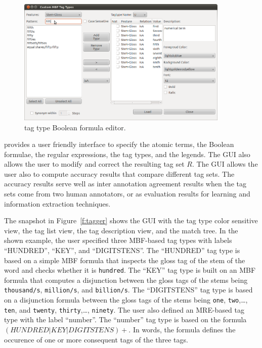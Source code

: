 \begin{figure}[tb]
  \centering
  \includegraphics[width=0.9\textwidth]{figures/mbfedit}
  \caption{\framework tag type Boolean formula editor.}
  \label{f:bfe}
\end{figure}

\framework provides a user friendly interface to specify the 
atomic terms, the \framework Boolean formulae, the \framework regular expressions, 
the tag types, and the legends. 
The \framework GUI also allows the user to modify and correct the 
resulting tag set $R$.
The \framework GUI allows the user also to compute accuracy results 
that compare different tag sets. 
The accuracy results serve well as inter annotation agreement results
when the tag sets come from two human annotators, 
or as evaluation results for learning and information extraction techniques. 

The snapshot in Figure~\ref{f:tagger} shows the \framework GUI with 
the tag type color sensitive view, the tag list view, the tag description view, 
and the match tree. 
In the shown example, the user specified three MBF-based tag types with labels ``HUNDRED'',
``KEY'', and ``DIGITSTENS''. 
The ``HUNDRED'' tag type is based on a simple MBF formula that inspects the gloss tag of 
the stem of the word and checks whether it is {\tt hundred}. 
The ``KEY'' tag type is built on an MBF formula that computes a disjunction 
between the gloss tags of the stems being {\tt thousand/s}, {\tt million/s}, and {\tt billion/s}. 
The ``DIGITSTENS'' tag type is based on a disjunction formula between the gloss tags of the stems 
being {\tt one}, {\tt two},\dots, {\tt ten}, and {\tt twenty}, {\tt thirty},\dots, {\tt ninety}. 
The user also defined an MRE-based tag type with the label ``number''. 
The ``number'' tag type is based on the formula $\left(\textit{HUNDRED}|\textit{KEY}|\textit{DIGITSTENS}\right)+$. 
In words, the formula defines the occurence of one or more consequent tags of the three tags.

